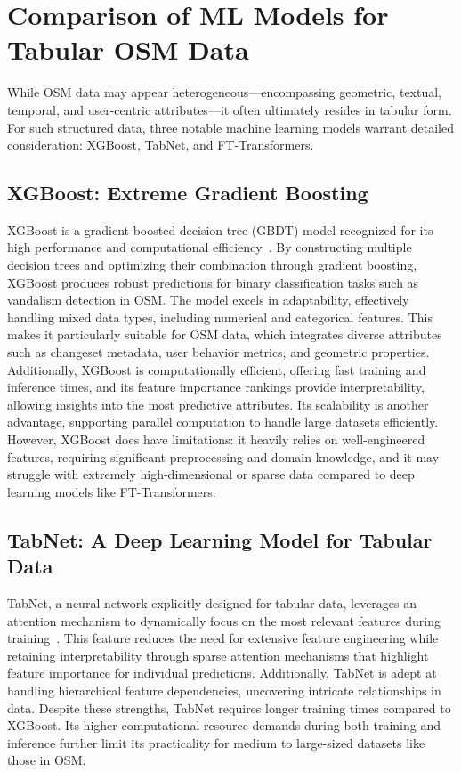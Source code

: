 \documentclass[
    13pt, %
    a4paper, %
    listof=totoc, %
    bibliography=totoc, %
    index=totoc, %
    headsepline
]{scrreprt}
\begin{document}
\section{Comparison of ML Models for Tabular OSM Data}
\label{sec:ml_comparison_for_osm}

While OSM data may appear heterogeneous—encompassing geometric, textual, temporal, and user-centric attributes—it often ultimately resides in tabular form. For such structured data, three notable machine learning models warrant detailed consideration: XGBoost, TabNet, and FT-Transformers.

\subsection{XGBoost: Extreme Gradient Boosting}
XGBoost is a gradient-boosted decision tree (GBDT) model recognized for its high performance and computational efficiency~\cite{chen2016xgboost}. By constructing multiple decision trees and optimizing their combination through gradient boosting, XGBoost produces robust predictions for binary classification tasks such as vandalism detection in OSM. The model excels in adaptability, effectively handling mixed data types, including numerical and categorical features. This makes it particularly suitable for OSM data, which integrates diverse attributes such as changeset metadata, user behavior metrics, and geometric properties. Additionally, XGBoost is computationally efficient, offering fast training and inference times, and its feature importance rankings provide interpretability, allowing insights into the most predictive attributes. Its scalability is another advantage, supporting parallel computation to handle large datasets efficiently. However, XGBoost does have limitations: it heavily relies on well-engineered features, requiring significant preprocessing and domain knowledge, and it may struggle with extremely high-dimensional or sparse data compared to deep learning models like FT-Transformers.

\subsection{TabNet: A Deep Learning Model for Tabular Data}
TabNet, a neural network explicitly designed for tabular data, leverages an attention mechanism to dynamically focus on the most relevant features during training~\cite{Arik2021}. This feature reduces the need for extensive feature engineering while retaining interpretability through sparse attention mechanisms that highlight feature importance for individual predictions. Additionally, TabNet is adept at handling hierarchical feature dependencies, uncovering intricate relationships in data. Despite these strengths, TabNet requires longer training times compared to XGBoost. Its higher computational resource demands during both training and inference further limit its practicality for medium to large-sized datasets like those in OSM.
\end{document}
